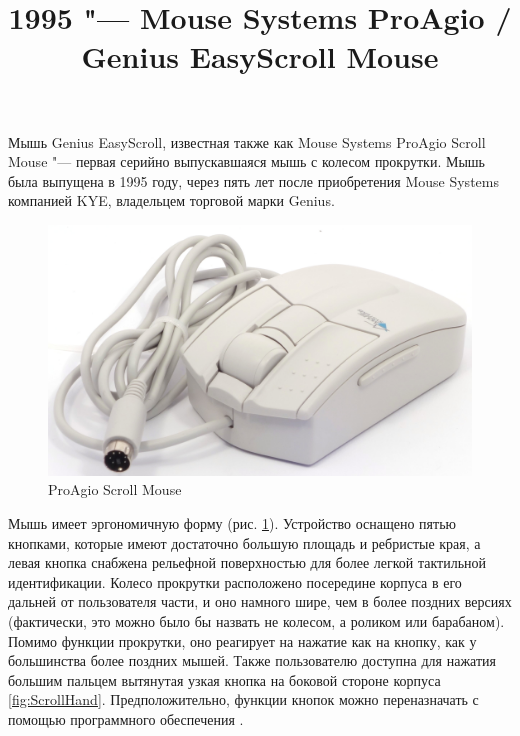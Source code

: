 \documentclass[11pt, a4paper]{article}
\begin{document}
\title{1995 "--- Mouse Systems ProAgio / Genius EasyScroll Mouse}
\date{}
\maketitle

Мышь Genius EasyScroll, известная также как Mouse Systems ProAgio Scroll Mouse "--- первая серийно выпускавшаяся мышь с колесом прокрутки. Мышь была выпущена в 1995 году, через пять лет после приобретения Mouse Systems компанией KYE, владельцем торговой марки Genius.

\begin{figure}[h]
    \centering
    \includegraphics[scale=0.5]{1995_pro_agio_scroll_mouse/pic_30.jpg}
    \caption{ProAgio Scroll Mouse}
    \label{fig:ScrollPic}
\end{figure}


Мышь имеет эргономичную форму (рис. \ref{fig:ScrollPic}). Устройство оснащено пятью кнопками, которые имеют достаточно большую площадь и ребристые края, а левая кнопка снабжена рельефной поверхностью для более легкой тактильной идентификации. Колесо прокрутки расположено посередине корпуса в его дальней от пользователя части, и оно намного шире, чем в более поздних версиях (фактически, это можно было бы назвать не колесом, а роликом или барабаном). Помимо функции прокрутки, оно реагирует на нажатие как на кнопку, как у большинства более поздних мышей. Также пользователю доступна для нажатия большим пальцем вытянутая узкая кнопка на боковой стороне корпуса \ref{fig:ScrollHand}. Предположительно, функции кнопок можно переназначать с помощью программного обеспечения \cite{yt}.
\end{document}
